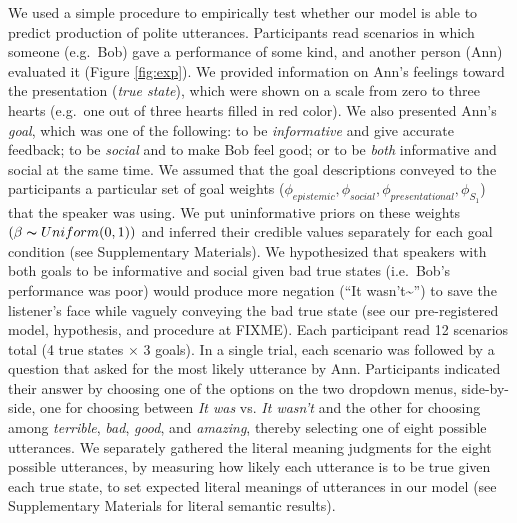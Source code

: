 \documentclass[12pt]{article}
\begin{document}

We used a simple procedure to empirically test whether our model is able to predict production of polite utterances. 
Participants read scenarios in which someone (e.g.~Bob) gave a performance of some kind, 
and another person (Ann) evaluated it (Figure \ref{fig:exp}). 
We provided information on Ann's feelings toward the presentation (\emph{true state}), 
which were shown on a scale from zero to three hearts 
(e.g.~one out of three hearts filled in red color). 
We also presented Ann's \emph{goal}, which was one of the following: 
to be \emph{informative} and give accurate feedback; 
to be \emph{social} and to make Bob feel good; 
or to be \emph{both} informative and social at the same time. 
We assumed that the goal descriptions conveyed to the participants a particular set of goal weights (\(\phi_{epistemic}, \phi_{social}, \phi_{presentational}, \phi_{S_1}\)) that the speaker was using. We put uninformative priors on these weights \((\beta \thicksim Uniform(0,1))\) and inferred their credible values separately for each goal condition (see Supplementary Materials).
We hypothesized that speakers with both goals to be informative and social given bad true states (i.e.~Bob's performance was poor) would produce more negation (\enquote{It wasn't\textasciitilde{}}) to save the listener's face while vaguely conveying the bad true state 
(see our pre-registered model, hypothesis, and procedure at FIXME). 
Each participant read 12 scenarios total (4 true states \(\times\) 3 goals).
In a single trial, each scenario was followed by a question that asked for the most likely utterance by Ann. 
Participants indicated their answer by choosing one of the options on the two dropdown menus, 
side-by-side, one for choosing between \emph{It was} vs. \emph{It wasn't} and the other for choosing among \emph{terrible}, \emph{bad}, \emph{good}, and \emph{amazing}, 
thereby selecting one of eight possible utterances. 
We separately gathered the literal meaning judgments for the eight possible utterances, 
by measuring how likely each utterance is to be true given each true state, to set expected
literal meanings of utterances in our model 
(see Supplementary Materials for literal semantic results).

\end{document}
